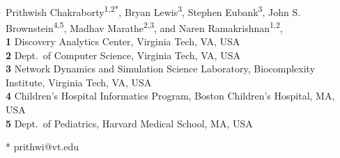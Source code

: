 \documentclass[10pt,letterpaper]{article}
\date{}
\begin{document}
\vspace*{0.2in}

\begin{flushleft}
{\Large
\textbf{} %
}
\newline
\\
Prithwish Chakraborty\textsuperscript{1,2*},
Bryan Lewis\textsuperscript{3},
Stephen Eubank\textsuperscript{3},
John S. Brownstein\textsuperscript{4,5},
Madhav Marathe\textsuperscript{2,3}, and
Naren Ramakrishnan\textsuperscript{1,2},
\\
\bigskip
\textbf{1} Discovery Analytics Center, Virginia Tech, VA, USA\\
\textbf{2} Dept.\ of Computer Science, Virginia Tech, VA, USA\\
\textbf{3} Network Dynamics and Simulation Science Laboratory, Biocomplexity Institute, Virginia Tech, VA, USA\\
\textbf{4} Children's Hospital Informatics Program, Boston Children’s Hospital, MA, USA\\
\textbf{5} Dept.\ of Pediatrics, Harvard Medical School, MA, USA\\
\bigskip

% 
%





* prithwi@vt.edu

\end{flushleft}
\end{document}
